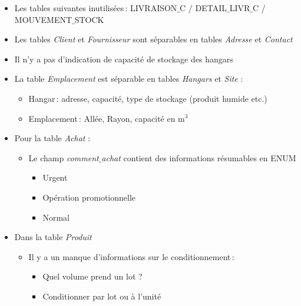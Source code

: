 \begin{itemize}

	\item Les tables suivantes inutilisées : LIVRAISON$\_$C / DETAIL$\_$LIVR$\_$C / MOUVEMENT$\_$STOCK
	\item  Les tables \textit{Client} et \textit{Fournisseur} sont séparables en tables \textit{Adresse} et \textit{Contact}  
	\item Il n’y a pas d’indication de capacité de stockage des hangars  \vertspace 
	\item La table \textit{Emplacement} est séparable en tables \textit{Hangars} et \textit{Site} :  


		\begin{itemize}
		
			\item Hangar : adresse, capacité, type de stockage (produit humide etc.)   

 			\item Emplacement : Allée, Rayon, capacité en m$^3$		
		
		\end{itemize} 

	\item Pour la table \textit{Achat} :  
	
		\begin{itemize}
			\item Le champ \textit{comment$\_$achat} contient des informations résumables en ENUM   
		

				\begin{itemize}

					\item Urgent
					\item Opération promotionnelle 
					\item Normal
				\end{itemize}
				
		\end{itemize}
	 
	\item Dans la table \textit{Produit}  

		\begin{itemize}
		  \item Il y a un manque d’informations sur le conditionnement : 
			 
			\begin{itemize}

				\item Quel volume prend un lot ? 
				\item Conditionner par lot ou à l’unité 
	

\end{itemize}
\end{itemize}
\end{itemize}
